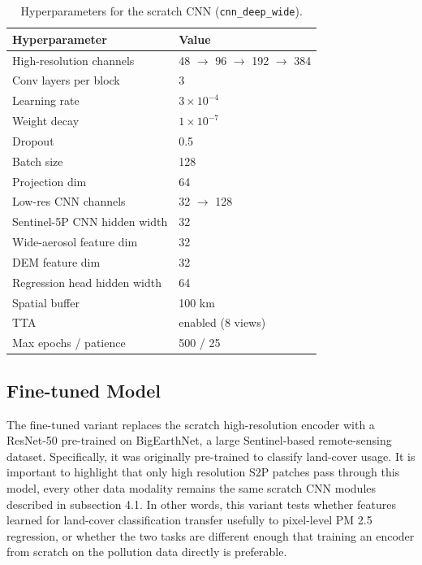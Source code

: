 \documentclass[english, a4paper, numbers=noenddot]{article}
\begin{document}
\begin{table}[h]
\centering
\caption{Hyperparameters for the scratch CNN (\texttt{cnn\_deep\_wide}).}
\label{tab:cnn_deep_wide_hparams}
\begin{tabular}{ll}
\hline
\textbf{Hyperparameter} & \textbf{Value} \\
\hline
High-resolution channels & 48 $\rightarrow$ 96 $\rightarrow$ 192 $\rightarrow$ 384 \\
Conv layers per block & 3 \\
Learning rate & $3\times10^{-4}$ \\
Weight decay & $1\times10^{-7}$ \\
Dropout & 0.5 \\
Batch size & 128 \\
Projection dim & 64 \\
Low-res CNN channels & 32 $\rightarrow$ 128 \\
Sentinel-5P CNN hidden width & 32 \\
Wide-aerosol feature dim & 32 \\
DEM feature dim & 32 \\
Regression head hidden width & 64 \\
Spatial buffer & 100 km \\
TTA & enabled (8 views) \\
Max epochs / patience & 500 / 25 \\
\hline
\end{tabular}
\end{table}




\subsection{Fine-tuned Model}

The fine-tuned variant replaces the scratch high-resolution encoder with a ResNet-50 pre-trained on BigEarthNet, a large Sentinel-based remote-sensing dataset. Specifically, it was originally pre-trained to classify land-cover usage. It is important to highlight that only high resolution S2P patches pass through this model, every other data modality remains the same scratch CNN modules described in subsection 4.1. In other words, this variant tests whether features learned for land-cover classification transfer usefully to pixel-level PM 2.5 regression, or whether the two tasks are different enough that training an encoder from scratch on the pollution data directly is preferable.
\end{document}
